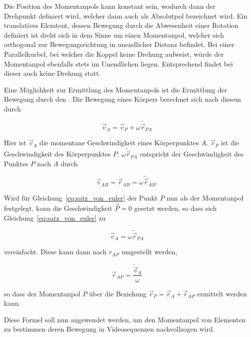 Die Position des Momentanpols kann konstant sein, wodurch dann der Drehpunkt definiert wird, welcher dann auch als Absolutpol bezeichnet wird.
Ein translatives Elemtent, dessen Bewegung durch die Abwesenheit einer Rotation definiert ist dreht sich in dem Sinne um einen Momentanpol, welcher sich orthogonal zur Bewegungsrichtung in unendlicher Distanz befindet.
Bei einer Parallelkurbel, bei welcher die Koppel keine Drehung aufweist, würde der Momentanpol ebenfalls stets im Unendlichen liegen.
Entsprechend findet bei dieser auch keine Drehung statt.

Eine Möglichkeit zur Ermittlung des Momentanpols ist die Ermittlung der Bewegung durch den \cite{Goessner2016}.
Die Bewegung eines Körpers berechnet sich nach diesem durch

\begin{equation}
    \vec{v}_A = \vec{v}_P + \omega \tilde{\vec{r}}_{PA}
    \label{eq:satz_von_euler}
\end{equation} 

Hier ist $\vec{v}_A$ die momentane Geschwindigkeit eines Körperpunktes $A$.
$\vec{v}_P$ ist die Geschwindigkeit des Körperpunktes $P$.
$\omega\tilde{\vec{r}}_{PA}$ entspricht der Geschwindigkeit des Punktes $P$ nach $A$ durch

\begin{equation}
    \vec{v}_{AB} = \dot{\vec{r}}_{AB} = \omega \tilde{\vec{r}}_{AB}.
    \label{eq:absolut_zu_winkel}
\end{equation}

Wird für Gleichung~\ref{eq:satz_von_euler} der Punkt $P$ nun als der Momentanpol festgelegt, kann die Geschwindigkeit $\vec{P} = 0$ gesetzt werden,
so dass sich Gleichung~\ref{eq:satz_von_euler} zu

\begin{equation}
    \vec{v}_A = \omega \tilde{\vec{r}}_{PA}
    \label{eq:satz_von_euler_momentanpol}
\end{equation}

vereinfacht. 
Diese kann dann nach $r_{AP}$ umgestellt werden,

\begin{equation}
    \vec{r}_{AP} = \frac{\tilde{\vec{v}}_A}{\omega}
    \label{eq:euler_rAP}
\end{equation}

so dass der Momentanpol $P$ über die Beziehung $\vec{r}_P = \vec{r}_A + \vec{r}_{AP}$ ermittelt werden kann.

Diese Formel soll nun angewendet werden, um den Momentanpol von Elementen zu bestimmen deren Bewegung in Videosequenzen nachvollzogen wird.


